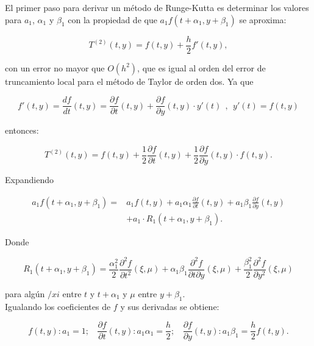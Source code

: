 El primer paso para derivar un método de Runge-Kutta es determinar los valores para $a_1$, $\alpha_1$ y $\beta_1$ con la propiedad de que $a_1 f(t+\alpha_1,y+\beta_1)$ se aproxima:

\begin{equation*}
    T^{(2)}(t,y)=f(t,y)+\frac{h}{2}f'(t,y),
\end{equation*}

con un error no mayor que $O(h^2)$, que es igual al orden del error de truncamiento local para el método de Taylor de orden dos. Ya que

\begin{equation*}
    f'(t,y)=\frac{df}{dt}(t,y)=\frac{\partial f}{\partial t} (t,y) + \frac{\partial f}{\partial y} (t,y)\cdot y'(t) \ \ , \ \ y'(t)= f(t,y)
\end{equation*}

entonces:

\begin{equation*}
    T^{(2)}(t,y)=f(t,y)+\frac{1}{2}\frac{\partial f}{\partial t} (t,y) + \frac{1}{2}\frac{\partial f}{\partial y} (t,y)\cdot f(t,y).
\end{equation*}

Expandiendo 

\begin{equation*}
\begin{split}
       a_1 f(t+\alpha _1, y + \beta _1)=&a_1f(t,y)+a_1\alpha _1 \frac{\partial f}{\partial t} (t,y) + a_1 \beta _1 \frac{\partial f}{\partial y} (t,y) \\
       & + a_1 \cdot R_1(t+\alpha _1, y + \beta _1).
\end{split}
\end{equation*}

Donde

\begin{equation*}
    R_1(t+\alpha _1, y + \beta _1) = \frac{\alpha_1^2}{2} \frac{\partial^2 f}{\partial t^2} (\xi,\mu) + \alpha _1\beta _1 \frac{\partial^2 f}{\partial t \partial y} (\xi,\mu) + \frac{\beta_1^2}{2} \frac{\partial^2 f}{\partial y^2} (\xi,\mu)
\end{equation*}

para algún $/xi$ entre $t$ y $t+\alpha_1$ y $\mu$ entre $ y + \beta _1$.
\\
Igualando los coeficientes de $f$ y sus derivadas se obtiene:

\begin{equation*}
    f(t,y): a_1=1; \ \ \ \ \frac{\partial f}{\partial t} (t,y):a_1 \alpha_1=\frac{h}{2}; \ \ \ \ \frac{\partial f}{\partial y} (t,y):a_1 \beta_1=\frac{h}{2}f(t,y).
\end{equation*}

